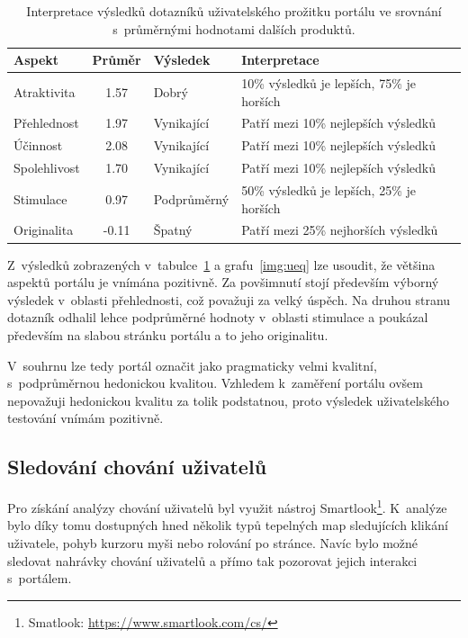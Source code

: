 \begin{table}[H]
\centering
\begin{tabular}{ |l|c|l|l| } 
\hline
Aspekt       & Průměr & Výsledek    & Interpretace                              \\
\hline
Atraktivita  & 1.57   & Dobrý       & 10\% výsledků je lepších, 75\% je horších \\
Přehlednost  & 1.97   & Vynikající  & Patří mezi 10\% nejlepších výsledků       \\
Účinnost     & 2.08   & Vynikající  & Patří mezi 10\% nejlepších výsledků       \\
Spolehlivost & 1.70   & Vynikající  & Patří mezi 10\% nejlepších výsledků       \\
Stimulace    & 0.97   & Podprůměrný & 50\% výsledků je lepších, 25\% je horších \\
Originalita  & -0.11  & Špatný      & Patří mezi 25\% nejhorších výsledků       \\  
\hline
\end{tabular}
\caption{Interpretace výsledků dotazníků uživatelského prožitku portálu ve srovnání s~průměrnými hodnotami dalších produktů.}
\label{table:ueq}
\end{table}



Z~výsledků zobrazených v~tabulce~\ref{table:ueq} a grafu~\ref{img:ueq} lze usoudit, že většina aspektů portálu je vnímána pozitivně. Za povšimnutí stojí především výborný výsledek v~oblasti přehlednosti, což považuji za velký úspěch. Na druhou stranu dotazník odhalil lehce podprůměrné hodnoty v~oblasti stimulace a poukázal především na slabou stránku portálu a to jeho originalitu.

V~souhrnu lze tedy portál označit jako pragmaticky velmi kvalitní, s~podprůměrnou hedonickou kvalitou.
Vzhledem k~zaměření portálu ovšem nepovažuji hedonickou kvalitu za tolik podstatnou, proto výsledek uživatelského testování vnímám pozitivně.




\subsection{Sledování chování uživatelů}\label{section:behaviour}
Pro získání analýzy chování uživatelů byl využit nástroj Smartlook\footnote{Smatlook: \url{https://www.smartlook.com/cs/}}. K~analýze bylo díky tomu dostupných hned několik typů tepelných map sledujících klikání uživatele, pohyb kurzoru myši nebo rolování po stránce. Navíc bylo možné sledovat nahrávky chování uživatelů a přímo tak pozorovat jejich interakci s~portálem.

